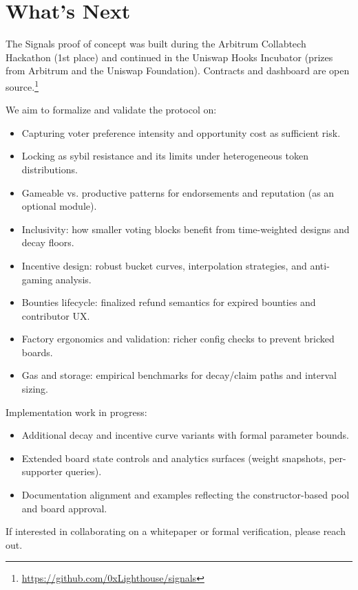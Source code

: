 \section{What's Next}
The Signals proof of concept was built during the Arbitrum Collabtech Hackathon (1st place) and continued in the Uniswap Hooks Incubator (prizes from Arbitrum and the Uniswap Foundation). Contracts and dashboard are open source.\footnote{\url{https://github.com/0xLighthouse/signals}}

We aim to formalize and validate the protocol on:
\begin{itemize}[leftmargin=*]
  \item Capturing voter preference intensity and opportunity cost as sufficient risk.
  \item Locking as sybil resistance and its limits under heterogeneous token distributions.
  \item Gameable vs. productive patterns for endorsements and reputation (as an optional module).
  \item Inclusivity: how smaller voting blocks benefit from time-weighted designs and decay floors.
  \item Incentive design: robust bucket curves, interpolation strategies, and anti-gaming analysis.
  \item Bounties lifecycle: finalized refund semantics for expired bounties and contributor UX.
  \item Factory ergonomics and validation: richer config checks to prevent bricked boards.
  \item Gas and storage: empirical benchmarks for decay/claim paths and interval sizing.
\end{itemize}

Implementation work in progress:
\begin{itemize}[leftmargin=*]
  \item Additional decay and incentive curve variants with formal parameter bounds.
  \item Extended board state controls and analytics surfaces (weight snapshots, per-supporter queries).
  \item Documentation alignment and examples reflecting the constructor-based pool and board approval.
\end{itemize}

If interested in collaborating on a whitepaper or formal verification, please reach out.

